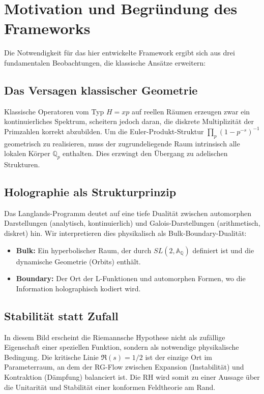 \documentclass[11pt, a4paper]{article}
\begin{document}
	\section{Motivation und Begründung des Frameworks}
	
	Die Notwendigkeit für das hier entwickelte Framework ergibt sich aus drei fundamentalen Beobachtungen, die klassische Ansätze erweitern:
	
	\subsection{Das Versagen klassischer Geometrie}
	Klassische Operatoren vom Typ $H=xp$ auf reellen Räumen erzeugen zwar ein kontinuierliches Spektrum, scheitern jedoch daran, die diskrete Multiplizität der Primzahlen korrekt abzubilden. Um die Euler-Produkt-Struktur $\prod_p (1-p^{-s})^{-1}$ geometrisch zu realisieren, muss der zugrundeliegende Raum intrinsisch alle lokalen Körper $\mathbb{Q}_p$ enthalten. Dies erzwingt den Übergang zu adelischen Strukturen.
	
	\subsection{Holographie als Strukturprinzip}
	Das Langlands-Programm deutet auf eine tiefe Dualität zwischen automorphen Darstellungen (analytisch, kontinuierlich) und Galois-Darstellungen (arithmetisch, diskret) hin. Wir interpretieren dies physikalisch als Bulk-Boundary-Dualität:
	\begin{itemize}
		\item \textbf{Bulk:} Ein hyperbolischer Raum, der durch $SL(2, \mathbb{A}_{\mathbb{Q}})$ definiert ist und die dynamische Geometrie (Orbits) enthält.
		\item \textbf{Boundary:} Der Ort der L-Funktionen und automorphen Formen, wo die Information holographisch kodiert wird.
	\end{itemize}
	
	\subsection{Stabilität statt Zufall}
	In diesem Bild erscheint die Riemannsche Hypothese nicht als zufällige Eigenschaft einer speziellen Funktion, sondern als notwendige physikalische Bedingung. Die kritische Linie $\Re(s)=1/2$ ist der einzige Ort im Parameterraum, an dem der RG-Flow zwischen Expansion (Instabilität) und Kontraktion (Dämpfung) balanciert ist. Die RH wird somit zu einer Aussage über die Unitarität und Stabilität einer konformen Feldtheorie am Rand.
	
\end{document}
